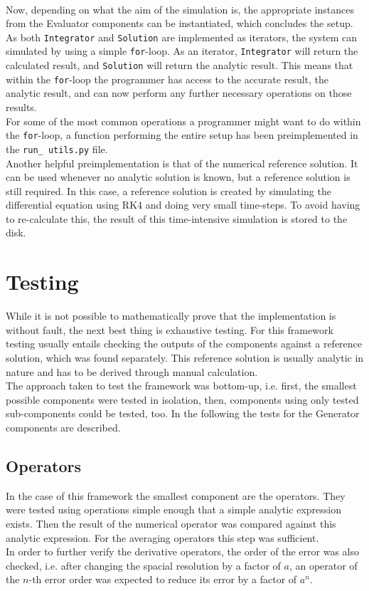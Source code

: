 \\
Now, depending on what the aim of the simulation is, the appropriate instances from the Evaluator components can be instantiated, which concludes the setup.
\\
As both \texttt{Integrator} and \texttt{Solution} are implemented as iterators, the system can simulated by using a simple \texttt{for}-loop.
As an iterator, \texttt{Integrator} will return the calculated result, and \texttt{Solution} will return the analytic result.
This means that within the \texttt{for}-loop the programmer has access to the accurate result, the analytic result, and can now perform any further necessary operations on those results.
\\
For some of the most common operations a programmer might want to do within the \texttt{for}-loop, a function performing the entire setup has been preimplemented in the \texttt{run\_ utils.py} file.
\\
Another helpful preimplementation is that of the numerical reference solution.
It can be used whenever no analytic solution is known, but a reference solution is still required.
In this case, a reference solution is created by simulating the differential equation using RK4 and doing very small time-steps.
To avoid having to re-calculate this, the result of this time-intensive simulation is stored to the disk.

\section{Testing}\label{sec:testing}
While it is not possible to mathematically prove that the implementation is without fault, the next best thing is exhaustive testing.
For this framework testing usually entails checking the outputs of the components against a reference solution, which was found separately.
This reference solution is usually analytic in nature and has to be derived through manual calculation.
\\
The approach taken to test the framework was bottom-up, i.e. first, the smallest possible components were tested in isolation, then, components using only tested sub-components could be tested, too.
In the following the tests for the Generator components are described.

\subsection{Operators}
In the case of this framework the smallest component are the operators.
They were tested using operations simple enough that a simple analytic expression exists.
Then the result of the numerical operator was compared against this analytic expression.
For the averaging operators this step was sufficient.
\\
In order to further verify the derivative operators, the order of the error was also checked, i.e. after changing the spacial resolution by a factor of $a$, an operator of the $n$-th error order was expected to reduce its error by a factor of $a^n$.


